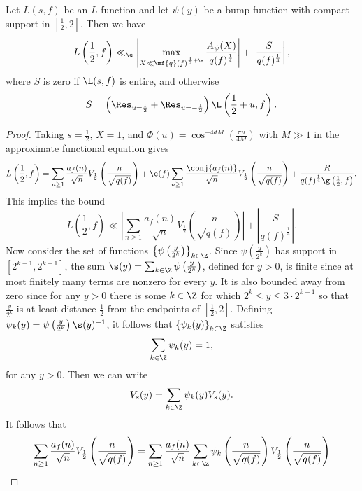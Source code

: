     \begin{theorem}
      Let $L(s,f)$ be an $L$-function and let $\psi(y)$ be a bump function with compact support in $\left[\frac{1}{2},2\right]$. Then we have
      \[
        L\left(\frac{1}{2},f\right) \ll_{\e} \left|\max_{X \ll \mf{q}(f)^{\frac{1}{2}+\e}}\frac{A_{\psi}(X)}{q(f)^{\frac{1}{4}}}\right|+\left|\frac{S}{q(f)^{\frac{1}{4}}}\right|,
      \]
      where $S$ is zero if $\L(s,f)$ is entire, and otherwise
      \[
        S = \left(\Res_{u = \frac{1}{2}}+\Res_{u = -\frac{1}{2}}\right)\L\left(\frac{1}{2}+u,f\right).
      \]
    \end{theorem}
    \begin{proof}
      Taking $s = \frac{1}{2}$, $X = 1$, and $\Phi(u) = \cos^{-4dM}\left(\frac{\pi u}{4M}\right)$ with $M \gg 1$ in the approximate functional equation gives
      \[
        L\left(\frac{1}{2},f\right) = \sum_{n \ge 1}\frac{a_{f}(n)}{\sqrt{n}}V_{\frac{1}{2}}\left(\frac{n}{\sqrt{q(f)}}\right)+\e(f)\sum_{n \ge 1}\frac{\conj{a_{f}(n)}}{\sqrt{n}}V_{\frac{1}{2}}\left(\frac{n}{\sqrt{q(f)}}\right)+\frac{R}{q(f)^{\frac{1}{4}}\g\left(\frac{1}{2},f\right)}.
      \]
      This implies the bound
      \[
        L\left(\frac{1}{2},f\right) \ll \left|\sum_{n \ge 1}\frac{a_{f}(n)}{\sqrt{n}}V_{\frac{1}{2}}\left(\frac{n}{\sqrt{q(f)}}\right)\right|+\left|\frac{S}{q(f)^{\frac{1}{4}}}\right|.
      \]
      Now consider the set of functions $\left\{\psi\left(\frac{y}{2^{k}}\right)\right\}_{k \in \Z}$. Since $\psi\left(\frac{y}{2^{k}}\right)$ has support in $[2^{k-1},2^{k+1}]$, the sum $\s(y) = \sum_{k \in \Z}\psi\left(\frac{y}{2^{k}}\right)$, defined for $y > 0$, is finite since at most finitely many terms are nonzero for every $y$. It is also bounded away from zero since for any $y > 0$ there is some $k \in \Z$ for which $2^{k} \le y \le 3 \cdot 2^{k-1}$ so that $\frac{y}{2^{k}}$ is at least distance $\frac{1}{2}$ from the endpoints of $\left[\frac{1}{2},2\right]$. Defining $\psi_{k}(y) = \psi\left(\frac{y}{2^{k}}\right)\s(y)^{-1}$, it follows that $\left\{\psi_{k}(y)\right\}_{k \in \Z}$ satisfies
      \[
        \sum_{k \in \Z}\psi_{k}(y) = 1,
      \]
      for any $y > 0$. Then we can write
      \[
        V_{s}(y) = \sum_{k \in \Z}\psi_{k}(y)V_{s}(y).
      \]
      It follows that
      \begin{align*}
        \sum_{n \ge 1}\frac{a_{f}(n)}{\sqrt{n}}V_{\frac{1}{2}}\left(\frac{n}{\sqrt{q(f)}}\right) &= \sum_{n \ge 1}\frac{a_{f}(n)}{\sqrt{n}}\sum_{k \in \Z}\psi_{k}\left(\frac{n}{\sqrt{q(f)}}\right)V_{\frac{1}{2}}\left(\frac{n}{\sqrt{q(f)}}\right) \\

\end{align*}
\end{proof}
